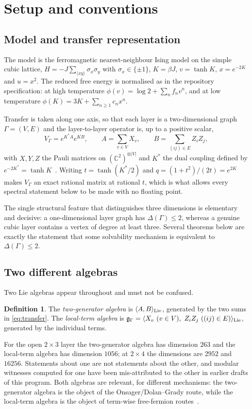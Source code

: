 \documentclass[11pt]{article}
\theoremstyle{definition}
\newtheorem{definition}[theorem]{Definition}
\newcommand{\Cb}{\mathbb{C}}
\newcommand{\alg}{\mathfrak{g}}
\begin{document}
\section{Setup and conventions}\label{sec:setup}

\subsection{Model and transfer representation}
The model is the ferromagnetic nearest-neighbour Ising model on the simple cubic lattice,
$H=-J\sum_{\langle xy\rangle}\sigma_x\sigma_y$ with $\sigma_x\in\{\pm1\}$, $K=\beta J$,
$v=\tanh K$, $x=e^{-2K}$ and $u=x^2$. The reduced free energy is normalised as in the repository
specification: at high temperature $\phi(v)=\log2+\sum_n f_n v^n$, and at low temperature
$\phi(K)=3K+\sum_{n\ge1}c_nx^n$.

Transfer is taken along one axis, so that each layer is a two-dimensional graph $\Gamma=(V,E)$ and
the layer-to-layer operator is, up to a positive scalar,
\begin{equation}
V_\Gamma=e^{K^*A}e^{KB},\qquad
A=\sum_{v\in V}X_v,\qquad
B=\sum_{(ij)\in E}Z_iZ_j,
\label{eq:transfer}
\end{equation}
with $X,Y,Z$ the Pauli matrices on $(\Cb^2)^{\otimes|V|}$ and $K^*$ the dual coupling defined by
$e^{-2K^*}=\tanh K$~\cite{schultzmattisl1964}. Writing $t=\tanh(K^*/2)$ and $q=(1+t^2)/(2t)=e^{2K}$
makes $V_\Gamma$ an exact rational matrix at rational $t$, which is what allows every spectral
statement below to be made with no floating point.

The single structural feature that distinguishes three dimensions is elementary and decisive: a
one-dimensional layer graph has $\Delta(\Gamma)\le2$, whereas a genuine cubic layer contains a vertex
of degree at least three. Several theorems below are exactly the statement that some solvability
mechanism is equivalent to $\Delta(\Gamma)\le2$.

\subsection{Two different algebras}\label{sec:twoalgebras}
Two Lie algebras appear throughout and must not be confused.
\begin{definition}
The \emph{two-generator algebra} is $\langle A,B\rangle_{\rm Lie}$, generated by the two sums in
\eqref{eq:transfer}. The \emph{local-term algebra} is
$\alg_\Gamma=\langle X_v\ (v\in V),\ Z_iZ_j\ ((ij)\in E)\rangle_{\rm Lie}$, generated by the
individual terms.
\end{definition}
For the open $2\times3$ layer the two-generator algebra has dimension $263$ and the local-term
algebra has dimension $1056$; at $2\times4$ the dimensions are $2952$ and $16256$. Statements about
one are not statements about the other, and modular witnesses computed for one have been
mis-attributed to the other in earlier drafts of this program. Both algebras are relevant, for
different mechanisms: the two-generator algebra is the object of the Onsager/Dolan--Grady route,
while the local-term algebra is the object of term-wise free-fermion
routes~\cite{chapman2020,elman2021,chapman2023}.
\end{document}
